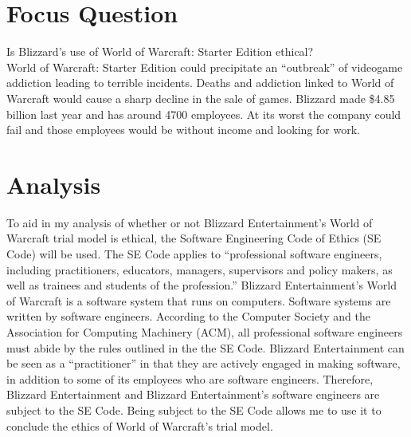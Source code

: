 \documentclass[11pt]{article}
\begin{document}
\begin{multicols}{2}
\setcounter{page}{1}

\section{Focus Question}
Is Blizzard's use of World of Warcraft: Starter Edition ethical? \\

World of Warcraft: Starter Edition could precipitate an ``outbreak'' of videogame addiction leading to terrible incidents. \cite{SnowlyDeath}\cite{ShawnDeath}\cite{ParentsBlameWoWForDeath}\cite{DeathAfter50Hours}\cite{YouStoleMySwordNowYouDie} Deaths and addiction linked to World of Warcraft would cause a sharp decline in the sale of games. Blizzard made \$4.85 billion last year and has around 4700 employees. \cite{BlizzardFinances}\cite{BlizzardEmployeeCount} At its worst the company could fail and those employees would be without income and looking for work.


\section{Analysis}

To aid in my analysis of whether or not Blizzard Entertainment's World of Warcraft trial model is ethical, the Software Engineering Code of Ethics (SE Code) will be used. The SE Code applies to ``professional software engineers, including practitioners, educators, managers, supervisors and policy makers, as well as trainees and students of the profession.'' \cite{SECode} Blizzard Entertainment's World of Warcraft is a software system that runs on computers. \cite{WoWSystemReqs} Software systems are written by software engineers. \cite{ACMApprovesSECode} According to the Computer Society and the Association for Computing Machinery (ACM), all professional software engineers must abide by the rules outlined in the the SE Code. \cite{ACMApprovesSECode}\cite{SECode} Blizzard Entertainment can be seen as a ``practitioner'' in that they are actively engaged in making software, in addition to some of its employees who are software engineers. Therefore, Blizzard Entertainment and Blizzard Entertainment's software engineers are subject to the SE Code. \cite{SECode} Being subject to the SE Code allows me to use it to conclude the ethics of World of Warcraft's trial model.


\end{multicols}
\end{document}
